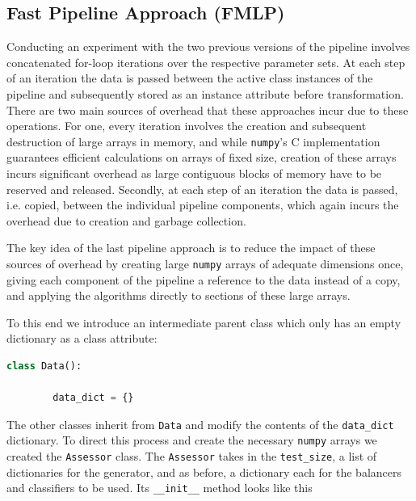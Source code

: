 \subsection{Fast Pipeline Approach (FMLP)}

Conducting an experiment with the two previous versions of the pipeline involves concatenated for-loop iterations over the respective parameter sets.
At each step of an iteration the data is passed between the active class instances of the pipeline and subsequently stored as an instance attribute before transformation.
There are two main sources of overhead that these approaches incur due to these operations.
For one, every iteration involves the creation and subsequent destruction of large arrays in memory, 
and while \texttt{numpy}'s C implementation guarantees efficient calculations on arrays of fixed size, 
creation of these arrays incurs significant overhead as large contiguous blocks of memory have to be reserved and released.
Secondly, at each step of an iteration the data is passed, i.e. copied, 
between the individual pipeline components, which again incurs the overhead due to creation and garbage collection.

The key idea of the last pipeline approach is to reduce the impact of these sources of overhead by creating large \texttt{numpy} arrays of adequate dimensions once,
giving each component of the pipeline a reference to the data instead of a copy, and applying the algorithms directly to sections of these large arrays.

To this end we introduce an intermediate parent class which only has an empty dictionary as a class attribute:
\begin{lstlisting}[language=Python, numbers=none]
class Data():

    	data_dict = {}
\end{lstlisting}

The other classes inherit from \texttt{Data} and modify the contents of the \texttt{data\_dict} dictionary.
To direct this process and create the necessary \texttt{numpy} arrays we created the \texttt{Assessor} class.
The \texttt{Assessor} takes in the \texttt{test\_size}, a list of dictionaries for the generator, and as before, a dictionary each for the balancers and classifiers to be used.
Its \texttt{\_\_init\_\_} method looks like this

